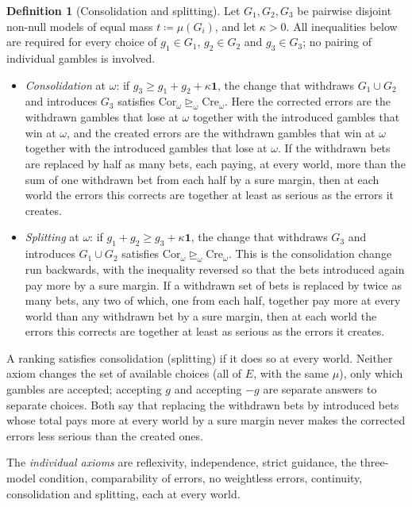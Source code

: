 \documentclass[11pt]{article}
\theoremstyle{definition}
\newtheorem{definition}[theorem]{Definition}
\newcommand{\one}{\mathbf 1}
\newcommand{\Cor}{\mathrm{Cor}}
\newcommand{\Cre}{\mathrm{Cre}}
\newcommand{\sge}{\trianglerighteq}
\begin{document}
\begin{definition}[Consolidation and splitting]\label{def:shape}
Let $G_1,G_2,G_3$ be pairwise disjoint non-null models of equal mass $t\coloneqq\mu(G_i)$, and let $\kappa>0$. All inequalities below are required for every choice of $g_1\in G_1$, $g_2\in G_2$ and $g_3\in G_3$; no pairing of individual gambles is involved.
\begin{itemize}[leftmargin=*]
\item \emph{Consolidation} at $\omega$: if $g_3\ge g_1+g_2+\kappa\one$, the change that withdraws $G_1\cup G_2$ and introduces $G_3$ satisfies $\Cor_\omega\sge_\omega\Cre_\omega$. Here the corrected errors are the withdrawn gambles that lose at $\omega$ together with the introduced gambles that win at $\omega$, and the created errors are the withdrawn gambles that win at $\omega$ together with the introduced gambles that lose at $\omega$. If the withdrawn bets are replaced by half as many bets, each paying, at every world, more than the sum of one withdrawn bet from each half by a sure margin, then at each world the errors this corrects are together at least as serious as the errors it creates.
\item \emph{Splitting} at $\omega$: if $g_1+g_2\ge g_3+\kappa\one$, the change that withdraws $G_3$ and introduces $G_1\cup G_2$ satisfies $\Cor_\omega\sge_\omega\Cre_\omega$. This is the consolidation change run backwards, with the inequality reversed so that the bets introduced again pay more by a sure margin. If a withdrawn set of bets is replaced by twice as many bets, any two of which, one from each half, together pay more at every world than any withdrawn bet by a sure margin, then at each world the errors this corrects are together at least as serious as the errors it creates.
\end{itemize}
A ranking satisfies consolidation (splitting) if it does so at every world. Neither axiom changes the set of available choices (all of $E$, with the same $\mu$), only which gambles are accepted; accepting $g$ and accepting $-g$ are separate answers to separate choices. Both say that replacing the withdrawn bets by introduced bets whose total pays more at every world by a sure margin never makes the corrected errors less serious than the created ones.
\end{definition}

The \emph{individual axioms} are reflexivity, independence, strict guidance, the three-model condition, comparability of errors, no weightless errors, continuity, consolidation and splitting, each at every world.
\end{document}
